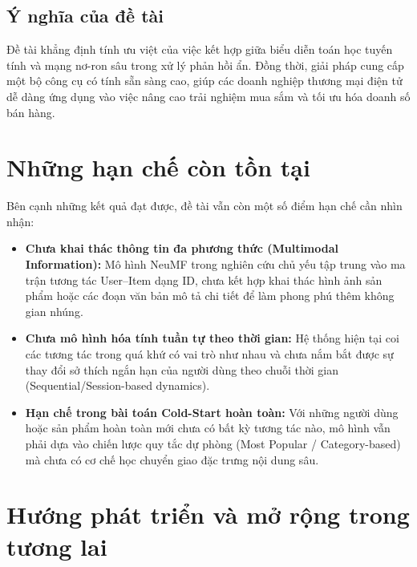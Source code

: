\subsection{Ý nghĩa của đề tài}
\label{subsec:ynghia_detai}

Đề tài khẳng định tính ưu việt của việc kết hợp giữa biểu diễn toán học tuyến tính và mạng nơ-ron sâu trong xử lý phản hồi ẩn. Đồng thời, giải pháp cung cấp một bộ công cụ có tính sẵn sàng cao, giúp các doanh nghiệp thương mại điện tử dễ dàng ứng dụng vào việc nâng cao trải nghiệm mua sắm và tối ưu hóa doanh số bán hàng.

\section{Những hạn chế còn tồn tại}
\label{sec:hanche}

Bên cạnh những kết quả đạt được, đề tài vẫn còn một số điểm hạn chế cần nhìn nhận:
\begin{itemize}
    \item \textbf{Chưa khai thác thông tin đa phương thức (Multimodal Information):} Mô hình NeuMF trong nghiên cứu chủ yếu tập trung vào ma trận tương tác User--Item dạng ID, chưa kết hợp khai thác hình ảnh sản phẩm hoặc các đoạn văn bản mô tả chi tiết để làm phong phú thêm không gian nhúng.
    \item \textbf{Chưa mô hình hóa tính tuần tự theo thời gian:} Hệ thống hiện tại coi các tương tác trong quá khứ có vai trò như nhau và chưa nắm bắt được sự thay đổi sở thích ngắn hạn của người dùng theo chuỗi thời gian (Sequential/Session-based dynamics).
    \item \textbf{Hạn chế trong bài toán Cold-Start hoàn toàn:} Với những người dùng hoặc sản phẩm hoàn toàn mới chưa có bất kỳ tương tác nào, mô hình vẫn phải dựa vào chiến lược quy tắc dự phòng (Most Popular / Category-based) mà chưa có cơ chế học chuyển giao đặc trưng nội dung sâu.
\end{itemize}

\section{Hướng phát triển và mở rộng trong tương lai}
\label{sec:huongphattrien}

